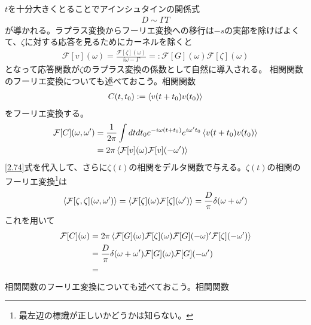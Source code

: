 \documentclass[autodetect-engine,dvipdfmx-if-dvi,ja=standard]{bxjsarticle}
\theoremstyle{break}
\begin{document}
                $t$を十分大きくとることでアインシュタインの関係式
                \begin{align}
                    D\sim \Gamma T
                \end{align}
                が導かれる。ラプラス変換からフーリエ変換への移行は$-s$の実部を除けばよくて、$\zeta$に対する応答を見るためにカーネルを除くと
                \begin{align}
                    \mathcal{F}[v](\omega)=\frac{\mathcal{F}[\zeta](\omega)}{i\omega-\Gamma}=:\mathcal{F}[G](\omega)\mathcal{F}[\zeta](\omega)
                    \label{2.74}
                \end{align}
                となって応答関数が$\zeta$のラプラス変換の係数として自然に導入される。
                相関関数のフーリエ変換についても述べておこう。相関関数
                \begin{align}
                    C(t,t_0):=\braket{v(t+t_0)v(t_0)}
                \end{align}
                をフーリエ変換する。
                \begin{align}
                    \mathcal{F}[C](\omega,\omega')&=\frac{1}{2\pi}\int dt dt_0  e^{-i\omega(t+t_0)}e^{i\omega' t_0}\braket{v(t+t_0)v(t_0)}\\
                    &=2\pi\braket{\mathcal{F}[v](\omega)\mathcal{F}[v](-\omega')}
                \end{align}
                \eqref{2.74}式を代入して、さらに$\zeta(t)$の相関をデルタ関数で与える。$\zeta(t)$の相関のフーリエ変換\footnote{最左辺の標識が正しいかどうかは知らない。}は
                \begin{align}
                    \braket{\mathcal{F}[\zeta,\zeta](\omega,\omega')}=\braket{\mathcal{F}[\zeta](\omega)\mathcal{F}[\zeta](\omega')}=\frac{D}{\pi}\delta(\omega+\omega')
                \end{align}
                これを用いて
                \begin{align}
                    \mathcal{F}[C](\omega)&=2\pi\braket{\mathcal{F}[G](\omega)\mathcal{F}[\zeta](\omega)\mathcal{F}[G](-\omega)'\mathcal{F}[\zeta](-\omega')}\\
                    &=\frac{D}{\pi}\delta(\omega+\omega')\mathcal{F}[G](\omega)\mathcal{F}[G](-\omega')\\
                    &=
                \end{align}
                \fi
                相関関数のフーリエ変換についても述べておこう。相関関数
\end{document}
